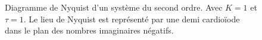 \begin{figure}[!h]
\begin{center}
\end{center}
\caption{Diagramme de Nyquist d'un système du second ordre. 
    Avec $K=1$ et $\tau=1$. Le lieu de Nyquist est représenté par une demi cardio\"iode dans le plan
    des nombres imaginaires négatifs.\label{fig-nyquist_2nd_1}}
\end{figure}

